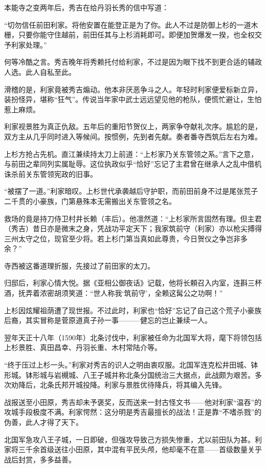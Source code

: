 \documentclass[
]{book}
\begin{document}
本能寺之变两年后，秀吉在给丹羽长秀的信中写道：

``切勿信任前田利家。将他安置在能登正是为了你。此人不过是防御上杉的一道木栅，只要你能守住越前，前田任其与上杉消耗即可。即便加贺爆发一揆，也全权交予利家处理。''

何等冷酷之言。秀吉晚年将秀赖托付给利家，不过是因为眼下找不到更合适的辅政人选。此人自私至此。

滑稽的是，利家竟被秀吉煽动。他本非厌恶争斗之人。年轻时利家便爱标新立异，装扮怪异，堪称``狂气''。传说当年家中武士远远望见他的枪队，便慌忙避让，生怕惹上麻烦。

利家视景胜为真正仇敌。五年后的重阳节贺仪上，两家争夺献礼次序。尴尬的是，双方主从几乎同时进入等候间。按惯例，先到者先献。奏者番寺西筑后左右为难。

上杉方抢占先机。直江兼续持太刀上前道：``上杉家乃关东管领之系。''言下之意，与前田之辈同列实属耻辱。这位执政似乎``恰好''忘记了主君曾在继承人之乱中借机诛杀前关东管领宪政的旧事。

``被摆了一道。''利家暗叹。上杉世代承袭越后守护职，而前田前身不过是尾张荒子二千贯的小豪族，门第悬殊本无需搬出关东管领之名。

救场的竟是持刀侍卫村井长赖（丰后）。他凛然道：``上杉家所言固然有理。但主君（秀吉）昔日亦是微末之身，凭战功平定天下；我家筑前守（利家）亦以枪尖搏得三州太守之位，现官至少将。若上杉门第当真如此尊贵，今日贺仪之争岂非多余？''

寺西被这番道理折服，先接过了前田家的太刀。

归邸后，利家心情大悦。据《亚相公御夜话》记载，他将长頼召入内室，连斟三杯酒，抚弄着浓密胡须笑道：``世人称我`筑前守'，全赖这髯公之功啊！''

上杉因炫耀祖荫遭了现世报。不过此时，利家也``恰好''忘记了自己这个荒子小豪族后裔，其实冒称是菅原道真子孙一事---------健忘的岂止兼续一人。

翌年天正十八年（1590年）北条讨伐中，利家被任命为北国军大将，麾下将领包括上杉景胜、真田昌幸、丹羽长重、木村常陆介等。

``终于压过上杉一头。''利家对秀吉的识人之明由衷叹服。北国军连克松井田城、钵形城。钵形城与岩槻城、八王子城并称北条分国统治三大据点，此战颇为艰苦。多次劝降后，北条氏邦开城投降。利家与景胜优待降兵，将其编入先锋。

战报送至小田原，秀吉却未予褒奖，反而送来一封古怪文书------他对利家``温吞''的攻城手段极度不满。利家愕然：这分明是秀吉最擅长的战法！正是靠``不嗜杀戮''的伪善，此人才得了天下。

北国军急攻八王子城，一日即破，但强攻导致己方损失惨重，尤以前田队为甚。利家将三千余首级送往小田原，其中混有平民头颅，他却毫不在意------首级数量关乎战后封赏，多多益善。
\end{document}
